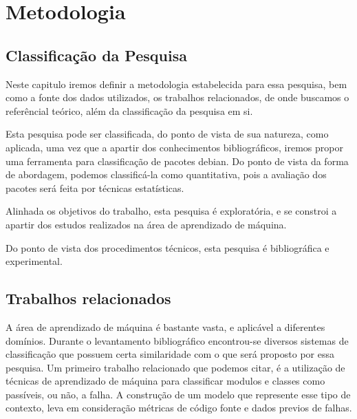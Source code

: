 \chapter{Metodologia}

\section{Classificação da Pesquisa}

Neste capitulo iremos definir a metodologia estabelecida para essa pesquisa, bem como
a fonte dos dados utilizados, os trabalhos relacionados, de onde buscamos o referêncial teórico,
além da classificação da pesquisa em si.

Esta pesquisa pode ser classificada, do ponto de vista de sua natureza, como aplicada, uma vez que a apartir dos conhecimentos bibliográficos,
iremos propor uma ferramenta para classificação de pacotes debian. Do ponto de vista da forma de abordagem, podemos classificá-la como
quantitativa, pois a avaliação dos pacotes será feita por técnicas estatísticas.

Alinhada os objetivos do trabalho, esta pesquisa é exploratória, e se constroi a apartir dos estudos realizados na área de aprendizado
de máquina.

Do ponto de vista dos procedimentos técnicos, esta pesquisa é bibliográfica e experimental.

\section{Trabalhos relacionados}

A área de aprendizado de máquina é bastante vasta, e aplicável a diferentes domínios.
Durante o levantamento bibliográfico encontrou-se diversos sistemas de classificação que possuem certa similaridade com o que será proposto por essa pesquisa.
Um primeiro trabalho relacionado que podemos citar, é a utilização de técnicas de aprendizado de máquina para classificar modulos e classes como passíveis, ou não, a falha\cite{Malhotra}.
A construção de um modelo que represente esse tipo de contexto, leva em consideração métricas de código fonte e dados previos de falhas\cite{Malhotra}.

